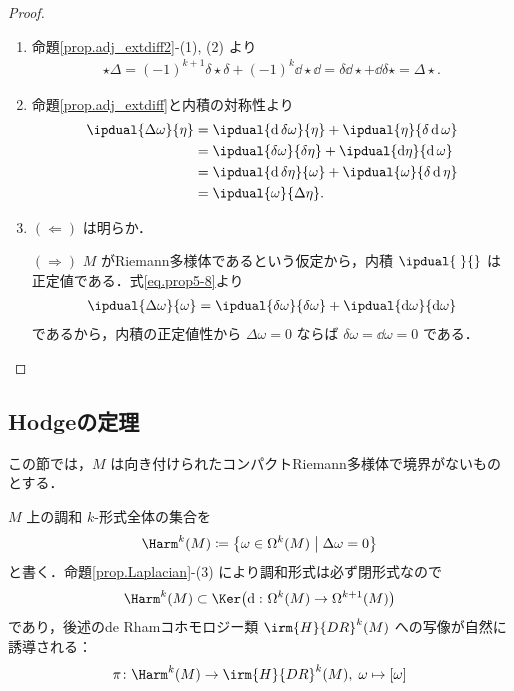 \documentclass[geometry_main]{subfiles}
\begin{document}
\begin{proof} 
	\begin{enumerate} 
		\item 命題\ref{prop.adj_extdiff2}-(1), (2) より
		\begin{align} 
			\star \Delta = (-1)^{k+1} \delta \star \delta + (-1)^k \dd{} \star \dd{} = \delta \dd{} \star  + \dd{}\delta \star = \Delta \star.
		\end{align}
		\item 命題\ref{prop.adj_extdiff}と内積の対称性より
		\begin{align} 
			\ipdual{\Delta \omega}{\eta} &= \ipdual{\dd{}\delta \omega}{\eta} + \ipdual{\eta}{\delta \dd{} \omega} \\
			&= \ipdual{\delta \omega}{\delta\eta} + \ipdual{\dd{\eta}}{\dd{} \omega} \label{eq.prop5-8} \\
			&= \ipdual{\dd{}\delta\eta}{\omega} + \ipdual{\omega}{\delta\dd{}\eta} \\
			&= \ipdual{\omega}{\Delta\eta}.
		\end{align}
		\item $(\Longleftarrow)$ は明らか．
		
		$(\Longrightarrow)$ $M$ がRiemann多様体であるという仮定から，内積 $\ipdual{\;}{}$ は正定値である．式\eqref{eq.prop5-8}より
		\begin{align} 
			\ipdual{\Delta \omega}{\omega} = \ipdual{\delta \omega}{\delta\omega} + \ipdual{\dd{\omega}}{\dd{\omega}}
		\end{align}
		であるから，内積の正定値性から $\Delta\omega = 0$ ならば $\delta \omega = \dd{\omega} = 0$ である．
	\end{enumerate}
\end{proof}


\subsection{Hodgeの定理}

この節では，$M$ は向き付けられたコンパクトRiemann多様体で境界がないものとする．

$M$ 上の調和 $k$-形式全体の集合を
\begin{align} 
	\Harm^k(M) \coloneqq \bigl\{ \omega \in \Omega^k(M) \bigm| \Delta \omega = 0 \bigr\} 
\end{align}
と書く．命題\ref{prop.Laplacian}-(3) により調和形式は必ず閉形式なので
\begin{align} 
	\Harm^k(M) \subset \Ker \bigl( \dd{} \colon \Omega^k(M) \to \Omega^{k+1}(M) \bigr) 
\end{align}
であり，後述のde Rhamコホモロジー類 $\irm{H}{DR}^k(M)$ への写像が自然に誘導される：
\begin{align} 
	\pi \colon \Harm^k(M) \to \irm{H}{DR}^k(M),\; \omega \mapsto [\omega]
\end{align}
\end{document}
